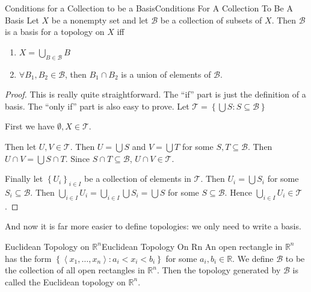 \documentclass[../main.tex]{subfiles}
\begin{document}
\begin{theorem}{Conditions for a Collection to be a Basis}{Conditions For A Collection To Be A Basis}
Let $X$ be a nonempty set and let $\mathcal{B}$ be a collection of subsets of $X$. Then $\mathcal{B}$ is a basis for a topology on $X$ iff
\begin{enumerate}
	\item $\displaystyle X = \bigcup_{B\in \mathcal{B}} B$ 
	\item $\forall B_1,B_2\in \mathcal{B}$, then $B_1\cap B_2$ is a union of elements of $\mathcal{B}$.
\end{enumerate}
\end{theorem}
\begin{proof}
	This is really quite straightforward. The ``if'' part is just the definition of a basis. The ``only if'' part is also easy to prove. Let $\mathcal{T} = \left\{ \bigcup S: S \subseteq \mathcal{B} \right\}$

	First we have $\emptyset , X\in \mathcal{T}$.

	Then let $U,V\in \mathcal{T}$. Then $U = \bigcup S$ and $V = \bigcup T$ for some $S,T\subseteq \mathcal{B}$. Then $U\cap V = \bigcup S\cap T$. Since $S\cap T\subseteq \mathcal{B}$, $U\cap V\in \mathcal{T}$.

	Finally let $\left\{ U_i \right\}_{i\in I}$ be a collection of elements in $\mathcal{T}$. Then $U_i = \bigcup S_i$ for some $S_i\subseteq \mathcal{B}$. Then $\bigcup_{i\in I} U_i = \bigcup_{i\in I} \bigcup S_i = \bigcup S$ for some $S\subseteq \mathcal{B}$. Hence $\bigcup_{i\in I} U_i\in \mathcal{T}$.
\end{proof}

And now it is far more easier to define topologies: we only need to write a basis.

\begin{definition}{Euclidean Topology on $\mathbb{R}^n$}{Euclidean Topology On Rn}
	An open rectangle in $\mathbb{R}^n$ has the form $\left\{ \left< x_1, \ldots ,x_n \right>: a_i<x_i<b_i \right\} $ for some $a_i,b_i\in \mathbb{R}$. We define $\mathcal{B}$ to be the collection of all open rectangles in $\mathbb{R}^n$. Then the topology generated by $\mathcal{B}$ is called the Euclidean topology on $\mathbb{R}^n$.
\end{definition}
\end{document}
